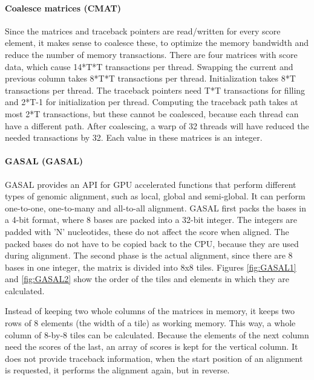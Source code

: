 \documentclass[../main/thesis.tex]{subfiles}
\begin{document}
\paragraph{Coalesce matrices (CMAT)}
Since the matrices and traceback pointers are read/written for every score element, it makes sense to coalesce these, to optimize the memory bandwidth and reduce the number of memory transactions.
There are four matrices with score data, which cause 14*T*T transactions per thread.
Swapping the current and previous column takes 8*T*T transactions per thread. 
Initialization takes 8*T transactions per thread.
The traceback pointers need T*T transactions for filling and 2*T-1 for initialization per thread.
Computing the traceback path takes at most 2*T transactions, but these cannot be coalesced, because each thread can have a different path.
After coalescing, a warp of 32 threads will have reduced the needed transactions by 32.
Each value in these matrices is an integer.

\paragraph{GASAL (GASAL)}
GASAL \cite{GASAL} provides an API for GPU accelerated functions that perform different types of genomic alignment, such as local, global and semi-global.
It can perform one-to-one, one-to-many and all-to-all alignment.
GASAL first packs the bases in a 4-bit format, where 8 bases are packed into a 32-bit integer.
The integers are padded with 'N' nucleotides, these do not affect the score when aligned.
The packed bases do not have to be copied back to the CPU, because they are used during alignment.
The second phase is the actual alignment, since there are 8 bases in one integer, the matrix is divided into 8x8 tiles.
Figures \ref{fig:GASAL1} and \ref{fig:GASAL2} show the order of the tiles and elements in which they are calculated.



Instead of keeping two whole columns of the matrices in memory, it keeps two rows of 8 elements (the width of a tile) as working memory.
This way, a whole column of 8-by-8 tiles can be calculated.
Because the elements of the next column need the scores of the last, an array of scores is kept for the vertical column.
It does not provide traceback information, when the start position of an alignment is requested, it performs the alignment again, but in reverse.
\end{document}
